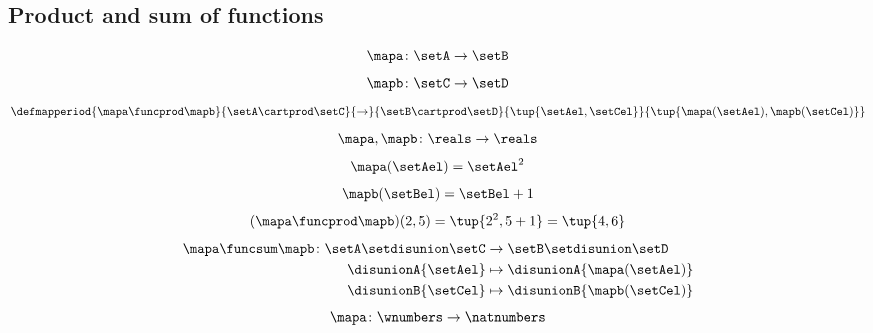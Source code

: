 \begin{forslides}
    \subsection{Product and sum of functions}

    \begin{equation}\label{eq:slides_session2_169}
        \mapa\colon \setA\to \setB
    \end{equation}
    \begin{equation}\label{eq:slides_session2_170}
        \mapb\colon \setC\to \setD
    \end{equation}
    \begin{equation}\label{eq:slides_session2_171}
        \defmapperiod{\mapa \funcprod \mapb}{\setA \cartprod \setC}{\to}{\setB\cartprod \setD}{\tup{\setAel, \setCel}}{\tup{\mapa(\setAel),\mapb(\setCel)}}
    \end{equation}
    \begin{equation}\label{eq:slides_session2_172}
        \mapa,\mapb\colon \reals \to \reals
    \end{equation}
    \begin{equation}\label{eq:slides_session2_173}
        \mapa(\setAel)=\setAel^2
    \end{equation}
    \begin{equation}\label{eq:slides_session2_174}
        \mapb(\setBel)=\setBel+1
    \end{equation}
    \begin{equation}\label{eq:slides_session2_175}
        (\mapa \funcprod \mapb)(2,5)=\tup{2^2,5+1}=\tup{4,6}
    \end{equation}
    \begin{equation}\label{eq:slides_session2_176}
        \begin{aligned}
            \mapa \funcsum \mapb \colon \setA \setdisunion \setC & \to \setB\setdisunion \setD \\
            \disunionA{\setAel}                                  & \mapsto \disunionA{\mapa(\setAel)} \\
            \disunionB{\setCel}                                  & \mapsto \disunionB{\mapb(\setCel)} \\
        \end{aligned}
    \end{equation}
    \begin{equation}\label{eq:slides_session2_177}
        \mapa\colon \wnumbers \to \natnumbers
    \end{equation}
    \begin{equation}\label{eq:slides_session2_178}

\end{equation}
\end{forslides}
